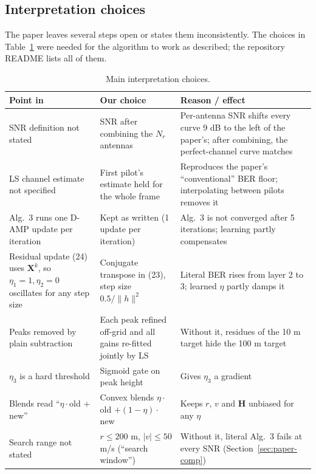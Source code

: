\documentclass[11pt,a4paper]{article}
\newcommand{\BH}{\mathbf{H}}
\newcommand{\BX}{\mathbf{X}}
\begin{document}
\subsection{Interpretation choices}\label{sec:choices}
The paper leaves several steps open or states them inconsistently. The choices in Table~\ref{tab:choices} were needed for the algorithm to work as described; the repository README lists all of them.

\begin{table}[H]
\centering\small
\begin{tabularx}{\textwidth}{>{\raggedright\arraybackslash}X>{\raggedright\arraybackslash}X>{\raggedright\arraybackslash}X}
\toprule
Point in~\cite{isacnet} & Our choice & Reason / effect \\
\midrule
SNR definition not stated & SNR after combining the $N_r$ antennas & Per-antenna SNR shifts every curve 9 dB to the left of the paper's; after combining, the perfect-channel curve matches \\
LS channel estimate not specified & First pilot's estimate held for the whole frame & Reproduces the paper's ``conventional'' BER floor; interpolating between pilots removes it \\
Alg.~3 runs one D-AMP update per iteration & Kept as written (1 update per iteration) & Alg.~3 is not converged after 5 iterations; learning partly compensates \\
Residual update (24) uses $\BX^k$, so $\eta_1=1,\eta_2=0$ oscillates for any step size & Conjugate transpose in (23), step size $0.5/\|h\|^2$ & Literal BER rises from layer 2 to 3; learned $\eta$ partly damps it \\
Peaks removed by plain subtraction & Each peak refined off-grid and all gains re-fitted jointly by LS & Without it, residues of the 10 m target hide the 100 m target \\
$\eta_3$ is a hard threshold & Sigmoid gate on peak height & Gives $\eta_3$ a gradient \\
Blends read ``$\eta\cdot$old + new'' & Convex blends $\eta\cdot$old $+(1-\eta)\cdot$new & Keeps $r$, $v$ and $\BH$ unbiased for any $\eta$ \\
Search range not stated & $r\le200$ m, $|v|\le50$ m/s (``search window'') & Without it, literal Alg.~3 fails at every SNR (Section~\ref{sec:paper-comp}) \\
\bottomrule
\end{tabularx}
\caption{Main interpretation choices.}
\label{tab:choices}
\end{table}
\end{document}
